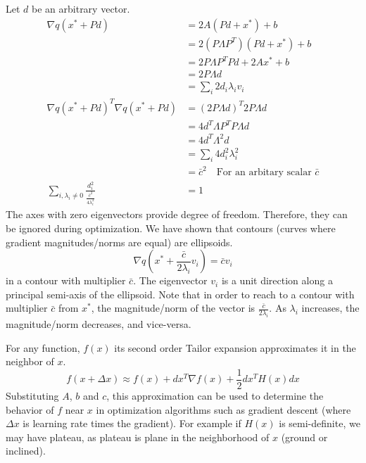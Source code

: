 \documentclass{book}
\numberwithin{equation}{subsection}
\begin{document}
Let $d$ be an arbitrary vector.
\begin{align}
    \nabla q(x^* + Pd) &= 2A(Pd + x^*)+b\\
    &= 2(P\Lambda P^T)(Pd + x^*)+b\\
    &= 2P\Lambda P^TPd + 2Ax^*+b\\
    &= 2P\Lambda d\\
    &= \sum_i 2d_i\lambda_i v_i\\
    \nabla q(x^*+Pd)^T \nabla q(x^*+Pd) &= (2P\Lambda d)^T2P\Lambda d\\
    &= 4d^T\Lambda P^TP\Lambda d\\
    &= 4d^T\Lambda^2 d\\
    &= \sum_i 4d_i^2  \lambda_i^2\\
    &= \bar{c}^2 \quad \text{For an arbitary scalar $\bar{c}$}\\
    \sum_{i,\lambda_i \neq 0} \frac{d_i^2}{\frac{\bar{c}^2}{4\lambda_i^2}} &= 1
\end{align}
The axes with zero eigenvectors provide degree of freedom. Therefore, they can be ignored during optimization. We have shown that contours (curves where gradient magnitudes/norms are equal) are ellipsoids.
\begin{equation}
    \nabla q(x^* + \frac{\bar{c}}{2\lambda_i}v_i) = \bar{c}v_i
\end{equation}
in a contour with multiplier $\bar{c}$. The eigenvector $v_i$ is a unit direction along a principal semi-axis of the ellipsoid. Note that in order to reach to a contour with multiplier $\bar{c}$ from $x^*$, the magnitude/norm of the vector is $\frac{\bar{c}}{2\lambda_i}$. As $\lambda_i$ increases, the magnitude/norm decreases, and vice-versa.

For any function, $f(x)$ its second order Tailor expansion approximates it in the neighbor of $x$.
\begin{equation}
    f(x+\Delta x) \approx f(x)+dx^T\nabla f(x)+\frac{1}{2}dx^TH(x)dx
\end{equation}
Substituting $A$, $b$ and $c$, this approximation can be used to determine the behavior of $f$ near $x$ in optimization algorithms such as gradient descent (where $\Delta x$ is learning rate times the gradient). For example if $H(x)$ is semi-definite, we may have plateau, as plateau is plane in the neighborhood of $x$ (ground or inclined).
\end{document}
